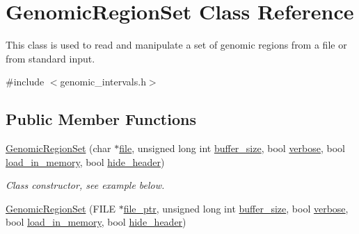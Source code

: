 \hypertarget{classGenomicRegionSet}{
\section{GenomicRegionSet Class Reference}
\label{classGenomicRegionSet}
}


This class is used to read and manipulate a set of genomic regions from a file or from standard input.  




{\ttfamily \#include $<$genomic\_\-intervals.h$>$}

\subsection*{Public Member Functions}
\begin{DoxyCompactItemize}
\item 
\hypertarget{classGenomicRegionSet_a38420b4118c310bdf694f6138ad08b13}{
\hyperlink{classGenomicRegionSet_a38420b4118c310bdf694f6138ad08b13}{GenomicRegionSet} (char $\ast$\hyperlink{classGenomicRegionSet_a7c593d1beab775590d5b810097644583}{file}, unsigned long int \hyperlink{classGenomicRegionSet_a4d60b5403d2d6aaeda541ed45625b245}{buffer\_\-size}, bool \hyperlink{classGenomicRegionSet_a2646e9e6d5da1693b4bea36a5acc082e}{verbose}, bool \hyperlink{classGenomicRegionSet_ade43c6cd72b95da75395129b00a52687}{load\_\-in\_\-memory}, bool \hyperlink{classGenomicRegionSet_a84dd2f8055524a933e963175781f7fd2}{hide\_\-header})}
\label{classGenomicRegionSet_a38420b4118c310bdf694f6138ad08b13}

\begin{DoxyCompactList}\small\item\em Class constructor, see example below. \end{DoxyCompactList}\item 
\hypertarget{classGenomicRegionSet_a449c1b13237caa3d16f55500d943f33b}{
\hyperlink{classGenomicRegionSet_a449c1b13237caa3d16f55500d943f33b}{GenomicRegionSet} (FILE $\ast$\hyperlink{classGenomicRegionSet_a4ca6c6268e39fdea2add6e6381c66962}{file\_\-ptr}, unsigned long int \hyperlink{classGenomicRegionSet_a4d60b5403d2d6aaeda541ed45625b245}{buffer\_\-size}, bool \hyperlink{classGenomicRegionSet_a2646e9e6d5da1693b4bea36a5acc082e}{verbose}, bool \hyperlink{classGenomicRegionSet_ade43c6cd72b95da75395129b00a52687}{load\_\-in\_\-memory}, bool \hyperlink{classGenomicRegionSet_a84dd2f8055524a933e963175781f7fd2}{hide\_\-header})}
\label{classGenomicRegionSet_a449c1b13237caa3d16f55500d943f33b}


\end{DoxyCompactItemize}
